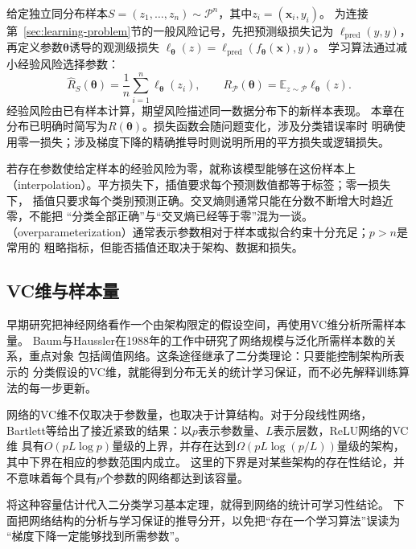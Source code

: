 给定独立同分布样本$S=(z_1,\ldots,z_n)\sim\mathcal P^n$，其中$z_i=(\bm x_i,y_i)$。
为连接第~\ref{sec:learning-problem}节的一般风险记号，先把预测级损失记为
$\ell_{\mathrm{pred}}(\widehat y,y)$，再定义参数$\bm\theta$诱导的观测级损失
$\ell_{\bm\theta}(z)=\ell_{\mathrm{pred}}(f_{\bm\theta}(\bm x),y)$。
学习算法通过减小经验风险选择参数：
\[
 \hat R_S(\bm\theta)=\frac1n\sum_{i=1}^n\ell_{\bm\theta}(z_i),
 \qquad
 R_{\mathcal P}(\bm\theta)=\mathbb E_{z\sim\mathcal P}\ell_{\bm\theta}(z).
\]
经验风险由已有样本计算，期望风险描述同一数据分布下的新样本表现。
本章在分布已明确时简写为$R(\bm\theta)$。损失函数会随问题变化，涉及分类错误率时
明确使用零一损失；涉及梯度下降的精确推导时则说明所用的平方损失或逻辑损失。

若存在参数使给定样本的经验风险为零，就称该模型能够在这份样本上
（interpolation）。平方损失下，插值要求每个预测数值都等于标签；零一损失下，
插值只要求每个类别预测正确。交叉熵则通常只能在分数不断增大时趋近零，不能把
“分类全部正确”与“交叉熵已经等于零”混为一谈。
（overparameterization）通常表示参数相对于样本或拟合约束十分充足；$p>n$是常用的
粗略指标，但能否插值还取决于架构、数据和损失。

\subsection{VC维与样本量}

早期研究把神经网络看作一个由架构限定的假设空间，再使用VC维分析所需样本量。
Baum与Haussler在1988年的工作中研究了网络规模与泛化所需样本数的关系，重点对象
包括阈值网络。这条途径继承了二分类理论：只要能控制架构所表示的
分类假设的VC维，就能得到分布无关的统计学习保证，而不必先解释训练算法的每一步更新。

网络的VC维不仅取决于参数量，也取决于计算结构。对于分段线性网络，
Bartlett等给出了接近紧致的结果：以$p$表示参数量、$L$表示层数，ReLU网络的VC维
具有$O(pL\log p)$量级的上界，并存在达到$\Omega(pL\log(p/L))$量级的架构，
其中下界在相应的参数范围内成立。
这里的下界是对某些架构的存在性结论，并不意味着每个具有$p$个参数的网络都达到该容量。

将这种容量估计代入二分类学习基本定理，就得到网络的统计可学习性结论。
下面把网络结构的分析与学习保证的推导分开，以免把“存在一个学习算法”误读为
“梯度下降一定能够找到所需参数”。

